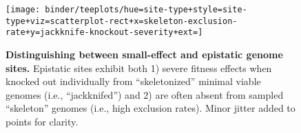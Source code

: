 \begin{figure}
  \centering
  \footnotesize
  \texttt{[image: binder/teeplots/hue=site-type+style=site-type+viz=scatterplot-rect+x=skeleton-exclusion-rate+y=jackknife-knockout-severity+ext=]}
  \vspace{-0.25in}
  \caption{%
    \textbf{Distinguishing between small-effect and epistatic genome sites.}
    \footnotesize
    Epistatic sites exhibit both 1) severe fitness effects when knocked out individually from ``skeletonized'' minimal viable genomes (i.e., ``jackknifed'') and 2) are often absent from sampled ``skeleton'' genomes (i.e., high exclusion rates).
    Minor jitter added to points for clarity.
  }
  \label{fig:epistatic}
  \vspace{-0.25in}
\end{figure}
